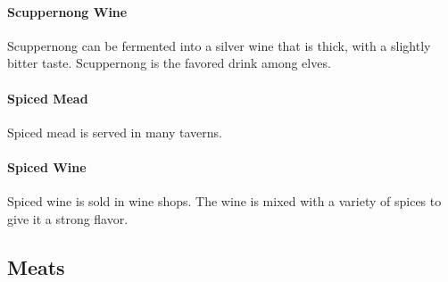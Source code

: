 \begin{multicols}{2}
\paragraph{Scuppernong Wine} Scuppernong can be fermented into a silver wine that is thick, with a slightly bitter taste. Scuppernong is the favored drink among elves.\\
\paragraph{Spiced Mead} Spiced mead is served in many taverns.\\
\paragraph{Spiced Wine} Spiced wine is sold in wine shops. The wine is mixed with a variety of spices to give it a strong flavor.\\

\end{multicols}
\hrulefill

\subsection{Meats}

